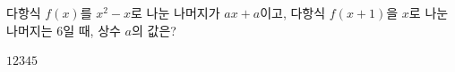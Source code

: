 다항식 $f(x)$를 $x^2-x$로 나눈 나머지가 $ax+a$이고, 다항식 $f(x+1)$을 $x$로 나눈 나머지는 $6$일 때, 상수 $a$의 값은?
\begin{choices32}{$1$}{$2$}{$3$}{$4$}{$5$}\end{choices32}
